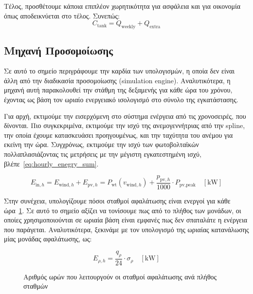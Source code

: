 Τέλος, προσθέτουμε κάποια επιπλέον χωρητικότητα για ασφάλεια και για οικονομία
όπως αποδεικνύεται στο τέλος. Συνεπώς:
\begin{equation}\label{eq:tank_capacity}
	C_{\text{tank}} = Q_{\text{weekly}} + Q_{\text{extra}}
\end{equation}

\subsection{Μηχανή Προσομοίωσης}
Σε αυτό το σημείο περιγράφουμε την καρδία των υπολογισμών, η οποία δεν είναι
άλλη από την διαδικασία προσομοίωσης (simulation engine). Αναλυτικότερα, η
μηχανή αυτή παρακολουθεί την στάθμη της δεξαμενής για κάθε ώρα του χρόνου,
έχοντας ως βάση τον ωριαίο ενεργειακό ισολογισμό στο σύνολο της εγκατάστασης.

Για αρχή, εκτιμούμε την εισερχόμενη στο σύστημα ενέργεια από τις χρονοσειρές,
που δίνονται. Πιο συγκεκριμένα, εκτιμούμε την ισχύ της ανεμογεννήτριας από την
spline, την οποία έχουμε κατασκευάσει προηγουμένως, και την ταχύτητα του ανέμου
για εκείνη την ώρα. Συγχρόνως, εκτιμούμε την ισχύ των φωτοβολταϊκών
πολλαπλασιάζοντας τις μετρήσεις με την μέγιστη εγκατεστημένη ισχύ, βλέπε~\eqref{eq:hourly_enegry_sum}.

\begin{equation}\label{eq:hourly_enegry_sum}
	E_{\text{in},h} = E_{\text{wind},h} + E_{\text{pv},h}= P_{\text{wt}} \left(v_{\text{wind},h}\right) + \frac{p_{\text{pv},h}}{1000}\cdot P_{\text{pv,peak}}\quad \left[\si{\kilo\watt}\right]
\end{equation}

Στην συνέχεια, υπολογίζουμε πόσοι σταθμοί αφαλάτωσης είναι ενεργοί για κάθε
ώρα~\ref{fig:working_hours_per_des}. Σε αυτό το σημείο αξίζει να τονίσουμε πως
από το πλήθος των μονάδων, οι οποίες χρησιμοποιούνται σε ωριαία βάση είναι
εμφανές πως δεν σπαταλάτε η ενέργεια που παράγεται. Αναλυτικότερα, ξεκινάμε με
τον υπολογισμό της ωριαίας κατανάλωσης μίας μονάδας αφαλάτωσης, ως:

\begin{equation}\label{eq:hourly_desalination_consumption}
	E_{\rho ,h}= \frac{q_{\rho}}{24}\cdot \sigma_{\rho}\quad \left[\si{\kilo\watt}\right]
\end{equation}

\begin{figure}[ht]
	\centering
	\caption{Αριθμός ωρών που λειτουργούν οι σταθμοί αφαλάτωσης ανά πλήθος σταθμών}\label{fig:working_hours_per_des}
\end{figure}

